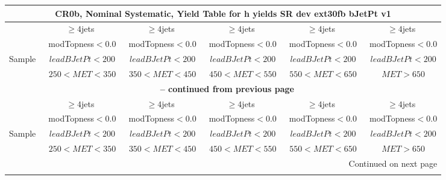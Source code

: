 \documentclass{article}
\begin{document}
\begin{longtable}{|l|c|c|c|c|c|} 
 
\multicolumn{6}{c}{ CR0b, Nominal Systematic, Yield Table for h yields SR dev ext30fb bJetPt v1 }\\* \hline 
  & $\ge4$jets  & $\ge4$jets  & $\ge4$jets  & $\ge4$jets  & $\ge4$jets \\* 
  & ~modTopness$<0.0$  & ~modTopness$<0.0$  & ~modTopness$<0.0$  & ~modTopness$<0.0$  & ~modTopness$<0.0$ \\* 
Sample  & ~$leadBJetPt<200$  & ~$leadBJetPt<200$  & ~$leadBJetPt<200$  & ~$leadBJetPt<200$  & ~$leadBJetPt<200$ \\* 
  & ~$250<MET<350$  & ~$350<MET<450$  & ~$450<MET<550$  & ~$550<MET<650$  & ~$MET>650$ \\* 
\hline \hline 
\endfirsthead 
 
\multicolumn{6}{c}{{\bfseries \tablename\ \thetable{} -- continued from previous page}}\\* \hline 
  & $\ge4$jets  & $\ge4$jets  & $\ge4$jets  & $\ge4$jets  & $\ge4$jets \\* 
  & ~modTopness$<0.0$  & ~modTopness$<0.0$  & ~modTopness$<0.0$  & ~modTopness$<0.0$  & ~modTopness$<0.0$ \\* 
Sample  & ~$leadBJetPt<200$  & ~$leadBJetPt<200$  & ~$leadBJetPt<200$  & ~$leadBJetPt<200$  & ~$leadBJetPt<200$ \\* 
  & ~$250<MET<350$  & ~$350<MET<450$  & ~$450<MET<550$  & ~$550<MET<650$  & ~$MET>650$ \\* 
\hline \hline 
\endhead 
 
\multicolumn{6}{|r|}{{Continued on next page}}\\* \hline 
\endfoot 
 
 
\endlastfoot 
 

\end{longtable}
\end{document}

